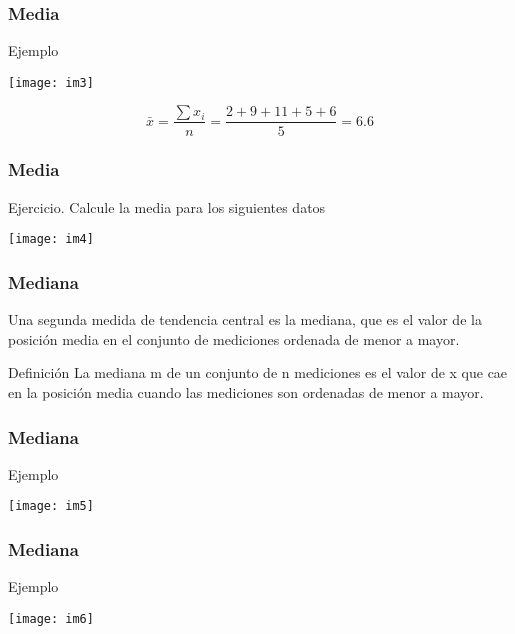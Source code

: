 \documentclass[spanish]{beamer}
\begin{document}
\begin{frame}
\frametitle{Media} 
Ejemplo
\begin{center}
\texttt{[image: im3]}
\end{center}

\begin{equation*}
\bar{x}= \frac{\sum x_{i}}{n}= \frac{2+9+11+5+6}{5}=6.6
\end{equation*}

\end{frame}
\begin{frame}
\frametitle{Media} 
Ejercicio. Calcule la media para los siguientes datos

\begin{center}
\texttt{[image: im4]}
\end{center}
\end{frame}
\begin{frame}
\frametitle{Mediana}

Una segunda medida de tendencia central es la mediana, que es el valor de la posición media en el conjunto de mediciones ordenada de menor a mayor.

\begin{block}{Definición}
La mediana m de un conjunto de n mediciones es el valor de x que cae
en la posición media cuando las mediciones son ordenadas de menor a mayor.
\end{block}

\end{frame}
\begin{frame}
\frametitle{Mediana}
Ejemplo 

\begin{center}
\texttt{[image: im5]}
\end{center}


\end{frame}
\begin{frame}
\frametitle{Mediana}
Ejemplo 

\begin{center}
\texttt{[image: im6]}
\end{center}

\end{frame}
\end{document}

